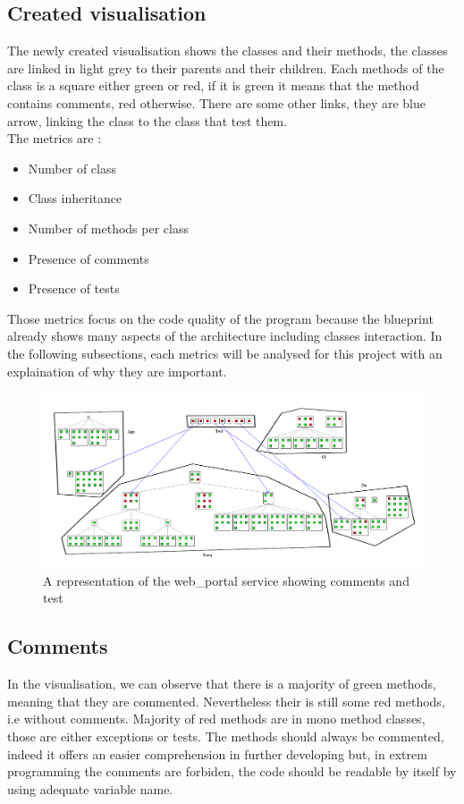 \documentclass[a4paper,10pt]{article}
\begin{document}
\subsection{Created visualisation}
The newly created visualisation shows the classes and their methods, the classes are linked in light grey to their parents and their children. Each methods of the class is a square either green or red, if it is green it means that the method contains comments, red otherwise. There are some other links, they are blue arrow, linking the class to the class that test them.\\
The metrics are :
\begin{itemize}
\item Number of class
\item Class inheritance
\item Number of methods per class
\item Presence of comments
\item Presence of tests
\end{itemize}

Those metrics focus on the code quality of the program because the blueprint already shows many aspects of the architecture including classes interaction. In the following subsections, each metrics will be analysed for this project with an explaination of why they are important.
\begin{figure}[h]
\includegraphics[width=\textwidth]{src/tc2.png}
\caption{A representation of the web\_portal service showing comments and test}
\end{figure}
\subsection{Comments}
In the visualisation, we can observe that there is a majority of green methods, meaning that they are commented. Nevertheless their is still some red methods, i.e without comments. Majority of red methods are in mono method classes, those are either exceptions or tests. The methods should always be commented, indeed it offers an easier comprehension in further developing but, in extrem programming the comments are forbiden, the code should be readable by itself by using adequate variable name.
\end{document}
